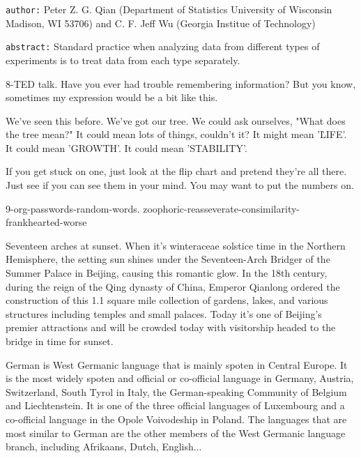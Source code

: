 {\tt author:} Peter Z. G. Qian (Department of Statistics University of Wisconsin Madison, WI 53706) and C. F. Jeff Wu (Georgia Institue of Technology)

{\tt abstract:} Standard practice when analyzing data from different types of experiments is to treat data from each type separately.

\fi

8-TED talk. Have you ever had trouble remembering information?
But you know, sometimes my expression would be a bit like this.

We've seen this before. We've got our tree. We could ask ourselves, "What does the tree mean?"
It could mean lots of things, couldn't it? It might mean '\.{LIFE}'. It could mean 'GROWTH'. It could mean 'STABILITY'.

If you get stuck on one, just look at the flip chart and pretend they're all there.
Just see if you can see them in your mind. You may want to put the numbers on.

\Y\B{}\par
\fi

9-org-passwords-random-words. zoophoric-reasseverate-consimilarity-frankhearted-worse

\smallskip{}

\fi

Seventeen arches at sunset. When it's winteraceae solstice time in the Northern Hemisphere, the setting sun shines under the Seventeen-Arch Bridger of the Summer Palace in Beijing, causing this romantic glow.
In the 18th century, during the reign of the Qing dynasty of China,
Emperor Qianlong
ordered the construction of this 1.1 square mile collection of gardens, lakes, and various structures including temples and small palaces.
Today it's one of Beijing's premier attractions and will be crowded today with visitorship headed to the bridge in time for sunset.
\smallskip{}

\fi

German is West Germanic language that is mainly spoten in Central Europe. It is the most widely spoten and official or co-official language in Germany,
Austria, Switzerland, South Tyrol in Italy, the German-speaking
Community of Belgium and Liechtenstein.
It is one of the three official languages of
Luxembourg and a co-official language in the Opole Voivodeship
in Poland. The languages that are most similar to German
are the other members of the West Germanic language branch,
including Afrikaans, Dutch, English...

